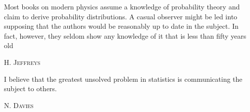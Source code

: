 \documentclass[\ifafour a4paper,12pt,\else a5paper,10pt,\fi%
onecolumn,oneside,article,%
british%
]{memoir}
\title{\propertitle}
\author{%
\hspace*{\stretch{1}}%
\parbox{0.5\linewidth}%
{\protect\centering P.G.L.  Porta Mana\\%
\footnotesize\epost{\email{piero.mana}{ntnu.no}}}%
\hspace*{\stretch{1}}%
}
\date{Draft of \today\ (first drafted \firstdraft)}
\theoremstyle{remark}
\theoremstyle{innote}
\newcommand*{\citep}{\parencites}
\newcommand*{\citey}{\parencites*}
\newcommand*{\amp}{\&}
\newcommand*{\asudedication}[1]{%
{\par\centering\textit{#1}\par}}
\renewcommand*{\|}{\nonscript\,\vert\nonscript\;\mathopen{}}
\begin{document}
\captiondelim{\quad}\captionnamefont{\footnotesize}\captiontitlefont{\footnotesize}
\frenchspacing
\maketitle

\abstractrunin
\abslabeldelim{}
\renewcommand*{\abstractname}{}
\setlength{\absleftindent}{0pt}
\setlength{\absrightindent}{0pt}
\setlength{\abstitleskip}{-\absparindent}
\begin{abstract}%
  \noindent A geometric tutorial on exchangeability
\\\noindent\emph{\footnotesize Note: Dear Reader
    \amp\ Peer, this manuscript is being peer-reviewed by you. Thank you.}
\end{abstract}
\frenchspacing

\setlength{\epigraphwidth}{.63\columnwidth}
\epigraphfontsize{\footnotesize}
\setlength{\epigraphrule}{0pt}
\setlength{\afterepigraphskip}{0pt} \epigraph{%
  Most books on modern physics assume a knowledge of probability theory and
  claim to derive probability distributions. A casual observer might be led
  into supposing that the authors would be reasonably up to date in the
  subject. In fact, however, they seldom show any knowledge of it that is
  less than fifty years
  old%
}{\textsc{H. Jeffreys} \citey[p.~275]{jeffreys1955}}
\vspace{-1em}
\epigraph{I believe that the
  greatest unsolved problem in statistics is communicating the subject to
  others.}{\textsc{N. Davies} \citep[in][p.~445]{copasetal1995}}
\end{document}
